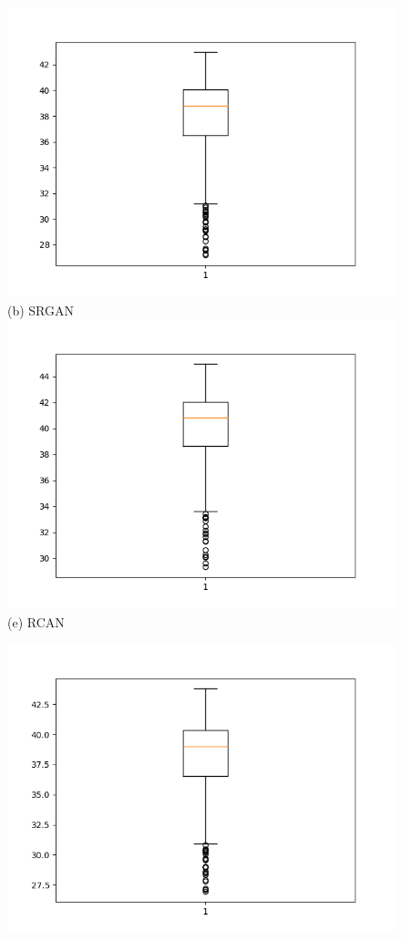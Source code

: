 \documentclass[conference]{IEEEtran}
\begin{document}
\begin{figure}[h!]
\begin{minipage}{0.3\textwidth}
  \centering
  \includegraphics[width=\textwidth,height=0.2\textheight]{srgan_y (1).png}
  (b) SRGAN 
  \includegraphics[width=\textwidth,height=0.2\textheight]{rcan_y (2).png}
  (e) RCAN
  \end{minipage}%
  \begin{minipage}{0.3\textwidth}
  \centering
  \includegraphics[width=\textwidth,height=0.2\textheight]{Figures/cyclegan_y.png}

\end{minipage}
\end{figure}
\end{document}
